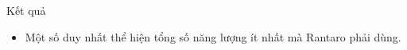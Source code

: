 Kết quả
\begin{itemize}
	\item     Một số duy nhất thể hiện tổng số năng lượng ít nhất mà    Rantaro    phải dùng.   
\end{itemize}